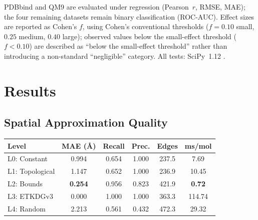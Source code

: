 \documentclass[pdflatex,sn-vancouver-num]{sn-jnl}%
\theoremstyle{thmstyleone}%
\theoremstyle{thmstyletwo}%
\theoremstyle{thmstylethree}%
\renewenvironment{table}[1][htbp]%
{\begin{tableorg}[#1]%
\begin{center}
\begin{adjustbox}{max width=\linewidth}
\begin{threeparttable}
\tablebodyfont%
\renewcommand\footnotetext[2][]{{\removelastskip\vskip3pt%
\let\tablebodyfont\tablefootnotefont%
\hskip0pt\if!##1!\else{\smash{$^{##1}$}}\fi##2\par}}%
}{\end{threeparttable}\end{adjustbox}\end{center}\end{tableorg}}
\begin{document}
PDBbind and QM9 are evaluated under regression (Pearson~$r$, RMSE, MAE); the four
remaining datasets remain binary classification (ROC-AUC).  Effect sizes
are reported as Cohen's $f$, using Cohen's conventional thresholds
($f = 0.10$ small, $0.25$ medium, $0.40$ large); observed values
below the small-effect threshold ($f < 0.10$) are described as ``below the small-effect
threshold'' rather than introducing a non-standard ``negligible'' category.
All tests: SciPy~1.12 \cite{virtanen2020scipy}.

\section{Results}
\label{sec:results}

\subsection{Spatial Approximation Quality}



\begin{table}[htbp]
  \centering
  \caption{Distance approximation quality vs.\ ETKDGv3 ground truth
  ($n{=}200$ drug-like molecules).  L2 achieves a $159{\times}$ speedup at
  only 0.254\,\AA{} MAE.}
  \label{tab:approx_quality}
  \renewcommand{\arraystretch}{1.25}
  \begin{tabular}{|l|c|c|c|c|c|}
    \hline
    \textbf{Level} & \textbf{MAE (\AA)} & \textbf{Recall} &
    \textbf{Prec.} & \textbf{Edges} & \textbf{ms/mol} \\
    \hline
    L0: Constant   & 0.994 & 0.654 & 1.000 & 237.5 & 7.69  \\
    \hline
    L1: Topological & 1.147 & 0.652 & 1.000 & 236.9 & 10.45 \\
    \hline
    L2: Bounds     & \textbf{0.254} & 0.956 & 0.823 & 421.9 & \textbf{0.72} \\
    \hline
    L3: ETKDGv3    & 0.000 & 1.000 & 1.000 & 363.3 & 114.74 \\
    \hline
    L4: Random     & 2.213 & 0.561 & 0.432 & 472.3 & 29.32  \\
    \hline
  \end{tabular}
\end{table}
\end{document}
